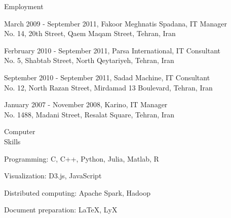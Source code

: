 \documentclass[10pt,letterpaper]{article}
\renewenvironment{itemize}{
  \begin{list}{}{
    \setlength{\leftmargin}{1.5em}
    \setlength{\itemsep}{0.25em}
    \setlength{\parskip}{0pt}
    \setlength{\parsep}{0.25em}
  }
}{
  \end{list}
}
\begin{document}
\begin{minipage}[t]{0.195\textwidth}
Employment 
\end{minipage}
\begin{minipage}[t]{0.795\textwidth}
\begin{itemize}

\item March 2009 - September 2011, Fakoor Meghnatis Spadana, IT Manager \\
No. 14, 20th Street, Qaem Maqam Street, Tehran, Iran

\item Ferbruary 2010 - September 2011, Parsa International, IT Consultant \\
No. 5, Shabtab Street, North Qeytariyeh, Tehran, Iran

\item September 2010 - September 2011, Sadad Machine, IT Consultant \\
No. 12, North Razan Street, Mirdamad 13 Boulevard, Tehran, Iran

\item January 2007 - November 2008, Karino, IT Manager \\
No. 1488, Madani Street, Resalat Square, Tehran, Iran

\end{itemize}
\end{minipage}


\bigskip
\bigskip

\begin{minipage}[t]{0.195\textwidth}
Computer \\
Skills 
\end{minipage}
\begin{minipage}[t]{0.795\textwidth}
\begin{itemize}
\item Programming: C, C++, Python, Julia, Matlab, R
\item Visualization: D3.js, JavaScript
\item Distributed computing: Apache Spark, Hadoop
\item Document preparation: \LaTeX, LyX
\end{itemize}
\end{minipage}

\bigskip
\bigskip
\end{document}

